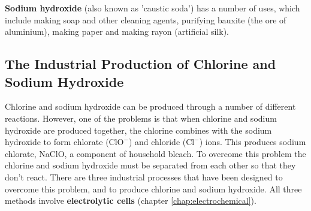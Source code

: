 \textbf{Sodium hydroxide} (also known as 'caustic soda') has a number of uses, which include making soap and other cleaning agents, purifying bauxite (the ore of aluminium), making paper and making rayon (artificial silk).

\subsection{The Industrial Production of Chlorine and Sodium Hydroxide}

Chlorine and sodium hydroxide can be produced through a number of different reactions. However, one of the problems is that when chlorine and sodium hydroxide are produced together, the chlorine combines with the sodium hydroxide to form chlorate ($\text{ClO}^{-}$) and chloride ($\text{Cl}^{-}$) ions. This produces sodium chlorate, NaClO, a component of household bleach. To overcome this problem the chlorine and sodium hydroxide must be separated from each other so that they don't react. There are three industrial processes that have been designed to overcome this problem, and to produce chlorine and sodium hydroxide. All three methods involve \textbf{electrolytic cells} (chapter \ref{chap:electrochemical}). 
\\



